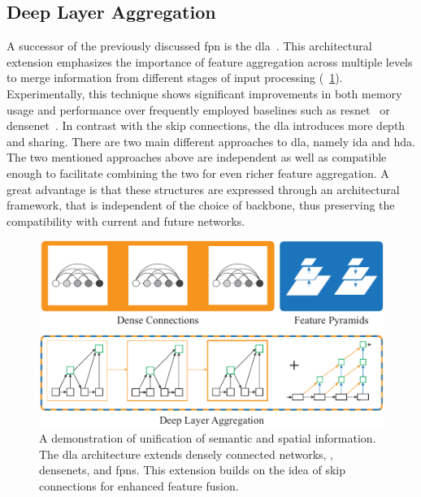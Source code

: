 \subsection{Deep Layer Aggregation}
\label{ssec:DeepLayerAggregation}


A successor of the previously discussed \gls{fpn} is the \gls{dla}~\cite{yu2019dla}. This architectural extension emphasizes the importance of feature aggregation across multiple levels to merge information from different stages of input processing (\figtext{}~\ref{fig:DLAMotivation}). Experimentally, this technique shows significant improvements in both memory usage and performance over frequently employed baselines such as \gls{resnet}~\cite{he2015resnet} or \gls{densenet}~\cite{huang2018densenet}. In contrast with the skip connections, the \gls{dla} introduces more depth and sharing. There are two main different approaches to \gls{dla}, namely \gls{ida} and \gls{hda}. The two mentioned approaches above are independent as well as compatible enough to facilitate combining the two for even richer feature aggregation. A great advantage is that these structures are expressed through an architectural framework, that is independent of the choice of backbone, thus preserving the compatibility with current and future networks.

\begin{figure}[t]
    \centerline{\includegraphics[width=0.75\linewidth]{figures/theoretical_foundations/dla_comparison.pdf}}
    \caption[\gls{dla} comparison]{A demonstration of unification of semantic and spatial information. The \gls{dla} architecture extends densely connected networks, \ietext{}, \glspl{densenet}, and \glspl{fpn}. This extension builds on the idea of skip connections for enhanced feature fusion. }
    \label{fig:DLAMotivation}
\end{figure}

